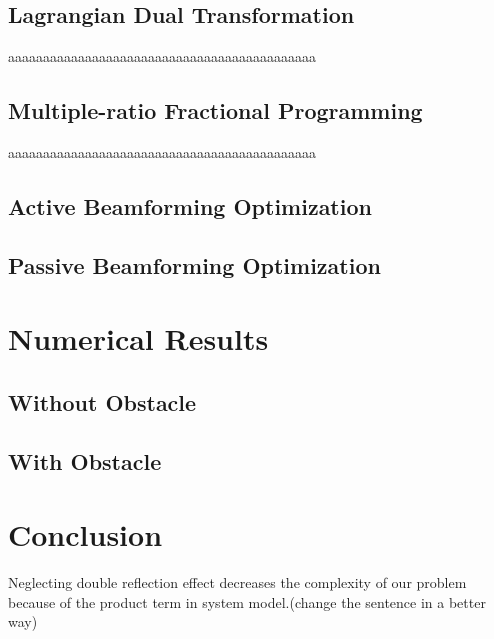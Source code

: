 \documentclass[11pt,twocolumn,twoside]{opticajnl}
\begin{document}
\subsection{Lagrangian Dual Transformation}
aaaaaaaaaaaaaaaaaaaaaaaaaaaaaaaaaaaaaaaaaaaa
\subsection{Multiple-ratio Fractional Programming}
aaaaaaaaaaaaaaaaaaaaaaaaaaaaaaaaaaaaaaaaaaaa
\subsection{Active Beamforming Optimization}

\subsection{Passive Beamforming Optimization}

\section{Numerical Results}

\subsection{Without Obstacle}

\subsection{With Obstacle}

\section{Conclusion}
Neglecting double reflection effect decreases the complexity of our problem because of the product term in system model.(change the sentence in a better way)
\end{document}
